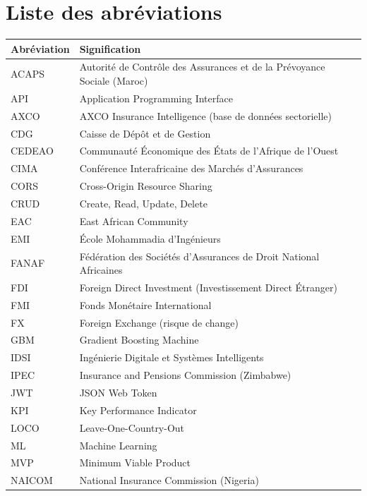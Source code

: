 \documentclass[../main.tex]{subfiles}
\begin{document}
\chapter*{Liste des abréviations}

\begin{center}
\begin{tabular}{@{}p{3cm}p{11.5cm}@{}}
\toprule
\textbf{Abréviation} & \textbf{Signification} \\
\midrule
ACAPS   & Autorité de Contrôle des Assurances et de la Prévoyance Sociale (Maroc) \\
API     & Application Programming Interface \\
AXCO    & AXCO Insurance Intelligence (base de données sectorielle) \\
CDG     & Caisse de Dépôt et de Gestion \\
CEDEAO  & Communauté Économique des États de l'Afrique de l'Ouest \\
CIMA    & Conférence Interafricaine des Marchés d'Assurances \\
CORS    & Cross-Origin Resource Sharing \\
CRUD    & Create, Read, Update, Delete \\
EAC     & East African Community \\
EMI     & École Mohammadia d'Ingénieurs \\
FANAF   & Fédération des Sociétés d'Assurances de Droit National Africaines \\
FDI     & Foreign Direct Investment (Investissement Direct Étranger) \\
FMI     & Fonds Monétaire International \\
FX      & Foreign Exchange (risque de change) \\
GBM     & Gradient Boosting Machine \\
IDSI    & Ingénierie Digitale et Systèmes Intelligents \\
IPEC    & Insurance and Pensions Commission (Zimbabwe) \\
JWT     & JSON Web Token \\
KPI     & Key Performance Indicator \\
LOCO    & Leave-One-Country-Out \\
ML      & Machine Learning \\
MVP     & Minimum Viable Product \\
NAICOM  & National Insurance Commission (Nigeria) \\

\end{tabular}
\end{center}
\end{document}
